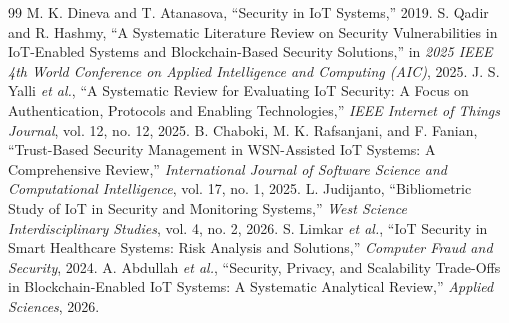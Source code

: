 \documentclass[conference]{IEEEtran}
\begin{document}
\begin{thebibliography}{99}
 M. K. Dineva and T. Atanasova, ``Security in IoT Systems,'' 2019.
 S. Qadir and R. Hashmy, ``A Systematic Literature Review on Security Vulnerabilities in IoT-Enabled Systems and Blockchain-Based Security Solutions,'' in \emph{2025 IEEE 4th World Conference on Applied Intelligence and Computing (AIC)}, 2025.
 J. S. Yalli \emph{et al.}, ``A Systematic Review for Evaluating IoT Security: A Focus on Authentication, Protocols and Enabling Technologies,'' \emph{IEEE Internet of Things Journal}, vol. 12, no. 12, 2025.
 B. Chaboki, M. K. Rafsanjani, and F. Fanian, ``Trust-Based Security Management in WSN-Assisted IoT Systems: A Comprehensive Review,'' \emph{International Journal of Software Science and Computational Intelligence}, vol. 17, no. 1, 2025.
 L. Judijanto, ``Bibliometric Study of IoT in Security and Monitoring Systems,'' \emph{West Science Interdisciplinary Studies}, vol. 4, no. 2, 2026.
 S. Limkar \emph{et al.}, ``IoT Security in Smart Healthcare Systems: Risk Analysis and Solutions,'' \emph{Computer Fraud and Security}, 2024.
 A. Abdullah \emph{et al.}, ``Security, Privacy, and Scalability Trade-Offs in Blockchain-Enabled IoT Systems: A Systematic Analytical Review,'' \emph{Applied Sciences}, 2026.
\end{thebibliography}
\end{document}
